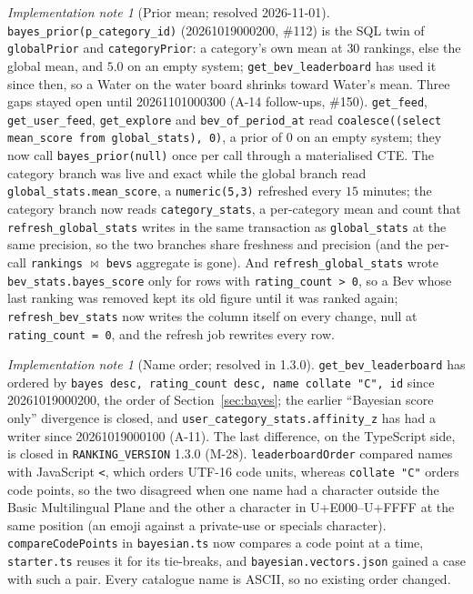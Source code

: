 \documentclass[11pt]{article}
\newcommand{\code}[1]{\texttt{#1}}
\theoremstyle{plain}
\theoremstyle{definition}
\theoremstyle{remark}
\newtheorem{implnote}[theorem]{Implementation note}
\begin{document}
\begin{implnote}[Prior mean; resolved 2026-11-01]\label{impl:prior}
\code{bayes\_prior(p\_category\_id)} (20261019000200, \#112) is the SQL twin of \code{globalPrior} and \code{categoryPrior}: a category's own mean at $30$ rankings, else the global mean, and $5.0$ on an empty system; \code{get\_bev\_leaderboard} has used it since then, so a Water on the water board shrinks toward Water's mean. Three gaps stayed open until 20261101000300 (A-14 follow-ups, \#150). \code{get\_feed}, \code{get\_user\_feed}, \code{get\_explore} and \code{bev\_of\_period\_at} read \code{coalesce((select mean\_score from global\_stats), 0)}, a prior of $0$ on an empty system; they now call \code{bayes\_prior(null)} once per call through a materialised CTE. The category branch was live and exact while the global branch read \code{global\_stats.mean\_score}, a \code{numeric(5,3)} refreshed every $15$ minutes; the category branch now reads \code{category\_stats}, a per-category mean and count that \code{refresh\_global\_stats} writes in the same transaction as \code{global\_stats} at the same precision, so the two branches share freshness and precision (and the per-call \code{rankings} $\bowtie$ \code{bevs} aggregate is gone). And \code{refresh\_global\_stats} wrote \code{bev\_stats.bayes\_score} only for rows with \code{rating\_count > 0}, so a Bev whose last ranking was removed kept its old figure until it was ranked again; \code{refresh\_bev\_stats} now writes the column itself on every change, null at \code{rating\_count = 0}, and the refresh job rewrites every row.
\end{implnote}

\begin{implnote}[Name order; resolved in 1.3.0]\label{impl:codepoints}
\code{get\_bev\_leaderboard} has ordered by \code{bayes desc, rating\_count desc, name collate "C", id} since 20261019000200, the order of Section~\ref{sec:bayes}; the earlier ``Bayesian score only'' divergence is closed, and \code{user\_category\_stats.affinity\_z} has had a writer since 20261019000100 (A-11). The last difference, on the TypeScript side, is closed in \code{RANKING\_VERSION} 1.3.0 (M-28). \code{leaderboardOrder} compared names with JavaScript \code{<}, which orders UTF-16 code units, whereas \code{collate "C"} orders code points, so the two disagreed when one name had a character outside the Basic Multilingual Plane and the other a character in U+E000--U+FFFF at the same position (an emoji against a private-use or specials character). \code{compareCodePoints} in \code{bayesian.ts} now compares a code point at a time, \code{starter.ts} reuses it for its tie-breaks, and \code{bayesian.vectors.json} gained a case with such a pair. Every catalogue name is ASCII, so no existing order changed.
\end{implnote}
\end{document}
